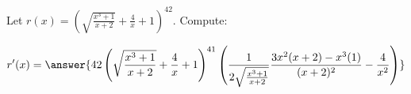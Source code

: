 \documentclass{ximera}
\author{Bobby Ramsey}
\begin{document}
\begin{exercise}
	Let $r(x) = \left(  \sqrt{\frac{x^3+1}{x+2}} + \frac{4}{x} + 1\right)^{42}$. Compute:

	\[ r'(x) =\answer{  42\left( \sqrt{\frac{x^3+1}{x+2}} + \frac{4}{x} + 1\right)^{41} \left( \frac{1}{2\sqrt{\frac{x^3+1}{x+2}}}\frac{3x^2(x+2)-x^3(1)}{(x+2)^2} - \frac{4}{x^2}\right)  } \]

\end{exercise}
\end{document}
